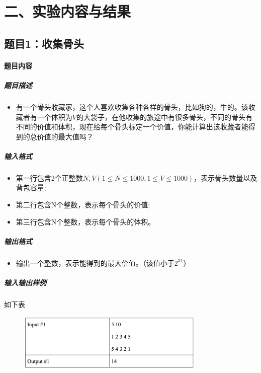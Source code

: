 \documentclass[12pt,a4paper]{ctexart}
\begin{document}
\vspace{5pt}

\section*{二、实验内容与结果}
\subsection*{题目1：收集骨头}
\paragraph{题目内容}
\subparagraph{题目描述}
\begin{itemize}
    \item 有一个骨头收藏家，这个人喜欢收集各种各样的骨头，比如狗的，牛的。该收藏者有一个体积为$V$的大袋子，在他收集的旅途中有很多骨头，不同的骨头有不同的价值和体积，现在给每个骨头标定一个价值，你能计算出该收藏者能得到的总价值的最大值吗？
\end{itemize}

\subparagraph{输入格式}
    \begin{itemize}
        \item 第一行包含2个正整数$N , V (1 \leq N \leq 1000 , 1 \leq V \leq 1000 )$，表示骨头数量以及背包容量; 
        \item 第二行包含N个整数，表示每个骨头的价值;
        \item 第三行包含N个整数，表示每个骨头的体积。
    \end{itemize}
\subparagraph{输出格式}
    \begin{itemize}
        \item 输出一个整数，表示能得到的最大价值。（该值小于$2^{31}$）
    \end{itemize}

\subparagraph{输入输出样例}
如下表
    \begin{figure}[h]
        \centering
        \includegraphics[width=0.80\textwidth]{q1_iodata.png}
    \end{figure}

\vspace{5pt}
\end{document}
